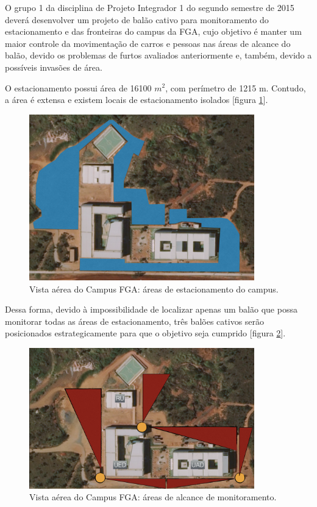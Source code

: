 O grupo 1 da disciplina de Projeto Integrador 1 do segundo semestre de 2015 deverá desenvolver um projeto de balão cativo para monitoramento do estacionamento e das fronteiras do campus da FGA, cujo objetivo é manter um maior controle da movimentação de carros e pessoas nas áreas de alcance do balão, devido os problemas de furtos avaliados anteriormente e, também, devido a possíveis invasões de área.

O estacionamento possui área de 16100 $m^2$, com perímetro de 1215 m. Contudo, a área é extensa e existem locais de estacionamento isolados [figura \ref{img:fga2}].

\begin{figure}[H]
  \centering
  \includegraphics[width=0.87\textwidth]{figuras/fga2}
  \caption{Vista aérea do Campus FGA: áreas de estacionamento do campus.}
  \label{img:fga2}
\end{figure}

Dessa forma, devido à impossibilidade de localizar apenas um balão que possa monitorar todas as áreas de estacionamento, três balões cativos serão posicionados estrategicamente para que o objetivo seja cumprido [figura \ref{img:fga3}].

\begin{figure}[H]
  \centering
  \includegraphics[width=0.87\textwidth]{figuras/fga3}
  \caption{Vista aérea do Campus FGA: áreas de alcance de monitoramento.}
  \label{img:fga3}
\end{figure}



